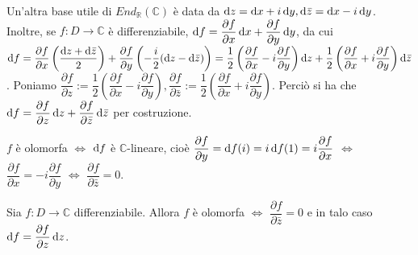 Un'altra base utile di $End_{\mathbb{R}}(\mathbb{C})$ è data da $\mathop{}\!\mathrm{d} z= \mathop{}\!\mathrm{d} x+i\mathop{}\!\mathrm{d} y, \mathop{}\!\mathrm{d} \bar{z}=\mathop{}\!\mathrm{d} x-i\mathop{}\!\mathrm{d} y$. Inoltre, se $f:D \longrightarrow \mathbb{C}$ è differenziabile, $\mathop{}\!\mathrm{d} f=\dfrac{\partial f}{\partial x}\mathop{}\!\mathrm{d} x+\dfrac{\partial f}{\partial y}\mathop{}\!\mathrm{d} y$,
da cui $\mathop{}\!\mathrm{d} f=\dfrac{\partial f}{\partial x}\left(\dfrac{\mathop{}\!\mathrm{d} z+\mathop{}\!\mathrm{d} \bar{z}}{2}\right)+\dfrac{\partial f}{\partial y}\left(-\dfrac{i}{2}(\mathop{}\!\mathrm{d} z-\mathop{}\!\mathrm{d} \bar{z})\right)=\dfrac{1}{2}\left(\dfrac{\partial f}{\partial x}-i\dfrac{\partial f}{\partial y}\right)\mathop{}\!\mathrm{d} z+\dfrac{1}{2}\left(\dfrac{\partial f}{\partial x}+i\dfrac{\partial f}{\partial y}\right)\mathop{}\!\mathrm{d} \bar{z}$.
Poniamo $\dfrac{\partial f}{\partial z}:=\dfrac{1}{2}\left(\dfrac{\partial f}{\partial x}-i\dfrac{\partial f}{\partial y}\right), \dfrac{\partial f}{\partial \bar{z}}:=\dfrac{1}{2}\left(\dfrac{\partial f}{\partial x}+i\dfrac{\partial f}{\partial y}\right)$.
Perciò si ha che $\mathop{}\!\mathrm{d} f=\dfrac{\partial f}{\partial z}\mathop{}\!\mathrm{d} z+\dfrac{\partial f}{\partial \bar{z}}\mathop{}\!\mathrm{d} \bar{z}$ per costruzione.

\begin{oss}
  $f$ è olomorfa $\iff$ $\mathop{}\!\mathrm{d} f$ è $\mathbb{C}$-lineare, cioè $\dfrac{\partial f}{\partial y}=\mathop{}\!\mathrm{d} f(i)=i\mathop{}\!\mathrm{d} f(1)=i\dfrac{\partial f}{\partial x}$ $\iff$ $\dfrac{\partial f}{\partial x}=-i\dfrac{\partial f}{\partial y}$ $\iff$ $\dfrac{\partial f}{\partial \bar{z}}=0$.
\end{oss}

\begin{prop}
  Sia $f:D \longrightarrow \mathbb{C}$ differenziabile. Allora $f$ è olomorfa $\iff$ $\dfrac{\partial f}{\partial \bar{z}}=0$ e in talo caso $\mathop{}\!\mathrm{d} f=\dfrac{\partial f}{\partial z}\mathop{}\!\mathrm{d} z$.
\end{prop}
